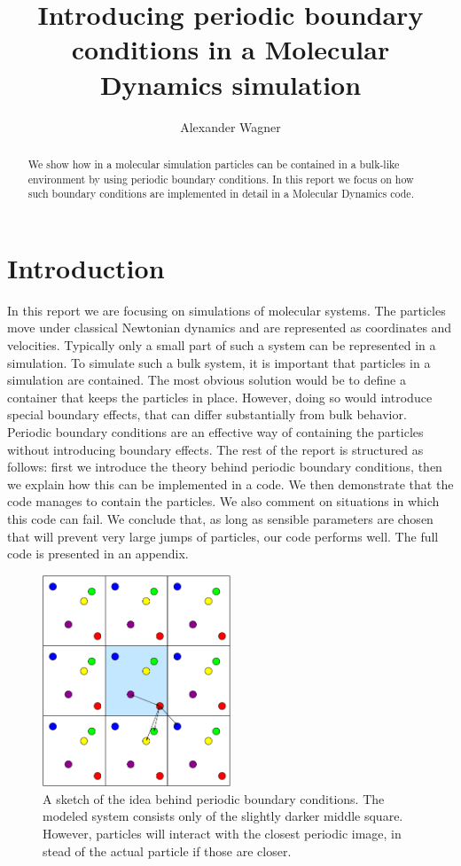 \documentclass{article}
\begin{document}
\lstset{language=C} 
\title{Introducing periodic boundary conditions in a Molecular Dynamics simulation}
\author{Alexander Wagner}
\maketitle
\begin{abstract}
 We show how in a molecular simulation particles can be contained in a bulk-like environment by using periodic boundary conditions. In this report we focus on how such boundary conditions are implemented in detail in a Molecular Dynamics code.
\end{abstract}

\section{Introduction}
In this report we are focusing on simulations of molecular systems. The particles move under classical Newtonian dynamics and are represented as coordinates and velocities. Typically only a small part of such a system can be represented in a simulation. To simulate such a bulk system, it is important that particles in a simulation are contained. The most obvious solution would be to define a container that keeps the particles in place. However, doing so would introduce special boundary effects, that can differ substantially from bulk behavior. Periodic boundary conditions are an effective way of containing the particles without introducing boundary effects. The rest of the report is structured as follows: first we introduce the theory behind periodic boundary conditions, then we explain how this can be implemented in a code. We then demonstrate that the code manages to contain the particles. We also comment on situations in which this code can fail. We conclude that, as long as sensible parameters are chosen that will prevent very large jumps of particles, our code performs well. The full code is presented in an appendix.

\begin{figure}
  \begin{center}
    \includegraphics[width=0.5\textwidth]{Periodic.eps}
  \end{center}
  \caption{\label{fig1}A sketch of the idea behind periodic boundary conditions. The modeled system consists only of the slightly darker middle square. However, particles will interact with the closest periodic image, in stead of the actual particle if those are closer.}
\end{figure}
\end{document}
